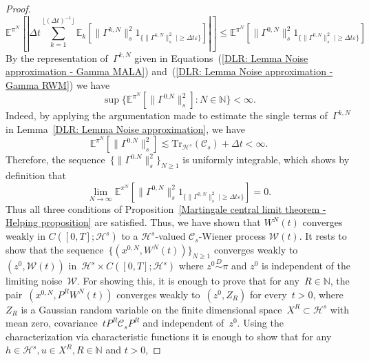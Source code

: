 \begin{proof}
  \begin{equation*}
    \mathbb{E}^{\pi^N} [ | \Delta t \sum_{k=1}^{\lfloor (\Delta t)^{-1} \rfloor} \mathbb{E}_k[ \| \Gamma^{k,N}\|_s^2 1_{\{ \| \Gamma^{k,N} \|_{s}^{2} \; | \geq \Delta t \varepsilon \}} ] | ]  \leq \mathbb{E}^{\pi^N} [\| \Gamma^{0,N}\|_s^2 1_{\{ \| \Gamma^{0,N} \|_{s}^{2} \; | \geq \Delta t \varepsilon \}}]
  \end{equation*}
  By the representation of~$\Gamma^{k,N}$ given in Equations~(\ref{DLR: Lemma Noise approximation - Gamma MALA}) and~(\ref{DLR: Lemma Noise approximation - Gamma RWM}) we have
  \begin{equation}
    \label{DLR: Proof Invariance principle bound on Gamma}
    \sup \{ \mathbb{E}^{\pi^N} [\| \Gamma^{0.N} \|_s^2] : N \in \mathbb{N}\} < \infty.
  \end{equation}
  Indeed, by applying the argumentation made to estimate the single terms of~$\Gamma^{k,N}$ in Lemma~\ref{DLR: Lemma Noise approximation}, we have
  \begin{equation*}
    \mathbb{E}^{\pi^N} [\| \Gamma^{0.N} \|_s^2] \lesssim \text{Tr}_{\mathcal{H}^s} (\mathcal{C}_s) + \Delta t < \infty.
  \end{equation*}
  Therefore, the sequence~$\{ \| \Gamma^{0.N} \|_s^2 \}_{N \geq 1}$ is uniformly integrable, which shows by definition that
  \begin{equation*}
    \lim_{N \to \infty} \mathbb{E}^{\pi^N} [\| \Gamma^{0,N}\|_s^2 1_{\{ \| \Gamma^{0,N} \|_{s}^{2} \; | \geq \Delta t \varepsilon \}}] = 0.
  \end{equation*}
  Thus all three conditions of Proposition~\ref{Martingale central limit theorem - Helping proposition} are satisfied. Thus, we have shown that $W^N(t)$ converges weakly in $C([0,T]; \mathcal{H}^s)$ to a $\mathcal{H}^s$-valued $\mathcal{C}_s$-Wiener process $\mathcal{W}(t)$. It rests to show that the sequence~$\{ (x^{0,N}, W^N(t))\}_{N \geq 1}$ converges weakly to~$(z^0, \mathcal{W}(t))$ in~$\mathcal{H}^s \times C([0,T]; \mathcal{H}^s)$ where $z^0 \stackrel{D}{\sim} \pi$ and $z^0$ is independent of the limiting noise~$\mathcal{W}$. For showing this, it is enough to prove that for any~$R \in \mathbb{N}$, the pair~$(x^{0,N}, P^R W^N(t))$ converges weakly to~$(z^0, Z_R)$ for every~$t > 0$, where ~$Z_R$ is a Gaussian random variable on the finite dimensional space~$X^R \subset \mathcal{H}^s$ with mean zero, covariance~$t P^R \mathcal{C}_sP^R$ and independent of~$z^0$. Using the characterization via characteristic functions it is enough to show that for any~$h \in \mathcal{H}^s, u \in X^R, R \in \mathbb{N}$ and $t>0$,

\end{proof}
